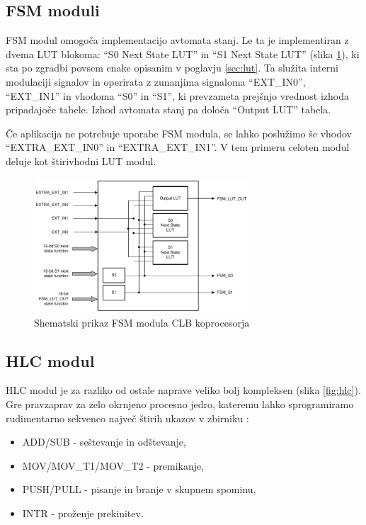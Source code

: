 \documentclass[a4paper]{article}
\begin{document}
\begin{sloppypar}
\subsection{FSM moduli}
FSM modul omogoča implementacijo avtomata stanj. Le ta je implementiran z dvema
LUT blokoma: ``S0 Next State LUT'' in ``S1 Next State
LUT'' (slika \ref{fig:fsm}), ki sta po zgradbi povsem enake opisanim v poglavju
\ref{sec:lut}. Ta služita interni modulaciji signalov in operirata z zunanjima
signaloma ``EXT\_IN0'', ``EXT\_IN1'' in vhodoma ``S0'' in ``S1'', ki prevzameta
prejšnjo vrednost izhoda pripadajoče tabele. Izhod avtomata stanj pa določa
``Output LUT'' tabela.

Če aplikacija ne potrebuje uporabe FSM modula, se lahko poslužimo še vhodov
``EXTRA\_EXT\_IN0'' in ``EXTRA\_EXT\_IN1''. V tem primeru celoten modul deluje
kot štirivhodni LUT modul.

\begin{figure}[htb]
    \centerline{\includegraphics[width=8cm]{shema_fsm}}
    \caption{Shematski prikaz FSM modula CLB koprocesorja
             \cite[Pogl.~26.4.3]{mcu-ref-manual}}
    \label{fig:fsm} 
\end{figure} 

\subsection{HLC modul}\label{sec:hlc}
HLC modul je za razliko od ostale naprave veliko bolj kompleksen (slika \ref{fig:hlc}).
Gre pravzaprav za zelo okrnjeno procesno jedro, kateremu lahko sprogramiramo
rudimentarno sekvenco največ štirih ukazov v zbirniku \cite[Pogl.~26.4.6.2]{mcu-ref-manual}:
\begin{itemize}
    \item ADD/SUB - seštevanje in odštevanje,
    \item MOV/MOV\_T1/MOV\_T2 - premikanje,
    \item PUSH/PULL - pisanje in branje v skupnem spominu,
    \item INTR - proženje prekinitev.
\end{itemize}


\end{sloppypar}
\end{document}
